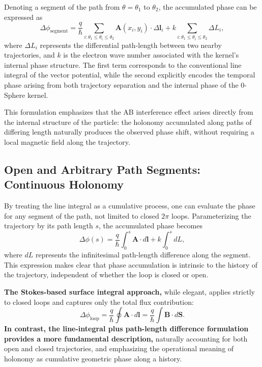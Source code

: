 \documentclass[%
 reprint,
 amsmath,amssymb,
 aps,
 prb,
]{revtex4-2}
\numberwithin{equation}{section}
\begin{document}
Denoting a segment of the path from $\theta = \theta_1$ to $\theta_2$, the accumulated phase can be expressed as
\begin{equation}
\Delta \phi_\mathrm{segment} = \frac{q}{\hbar} \sum_{i:\theta_1 \le \theta_i \le \theta_2} \mathbf{A}(x_i,y_i) \cdot \Delta \mathbf{l}_i + k \sum_{i:\theta_1 \le \theta_i \le \theta_2} \Delta L_i,
\label{eq:ab_partial_phase_pathdiff}
\end{equation}
where $\Delta L_i$ represents the differential path-length between two nearby trajectories, and $k$ is the electron wave number associated with the kernel's internal phase structure. The first term corresponds to the conventional line integral of the vector potential, while the second explicitly encodes the temporal phase arising from both trajectory separation and the internal phase of the 0-Sphere kernel.

This formulation emphasizes that the AB interference effect arises directly from the internal structure of the particle: the holonomy accumulated along paths of differing length naturally produces the observed phase shift, without requiring a local magnetic field along the trajectory.


\subsection{Open and Arbitrary Path Segments: Continuous Holonomy}
\label{sec:ab_continuous_holonomy}

By treating the line integral as a cumulative process, one can evaluate the phase for any segment of the path, not limited to closed $2\pi$ loops. Parameterizing the trajectory by its path length $s$, the accumulated phase becomes
\begin{equation}
\Delta \phi(s) = \frac{q}{\hbar} \int_0^s \mathbf{A} \cdot d\mathbf{l} + k \int_0^s dL,
\end{equation}
where $dL$ represents the infinitesimal path-length difference along the segment. This expression makes clear that phase accumulation is intrinsic to the history of the trajectory, independent of whether the loop is closed or open.

\textbf{The Stokes-based surface integral approach,} while elegant, applies strictly to closed loops and captures only the total flux contribution:
\begin{equation}
\Delta \phi_\mathrm{loop} = \frac{q}{\hbar} \oint \mathbf{A} \cdot d\mathbf{l} = \frac{q}{\hbar} \int \mathbf{B} \cdot d\mathbf{S}.
\end{equation}
\textbf{In contrast, the line-integral plus path-length difference formulation provides a more fundamental description,} naturally accounting for both open and closed trajectories, and emphasizing the operational meaning of holonomy as cumulative geometric phase along a history.
\end{document}
